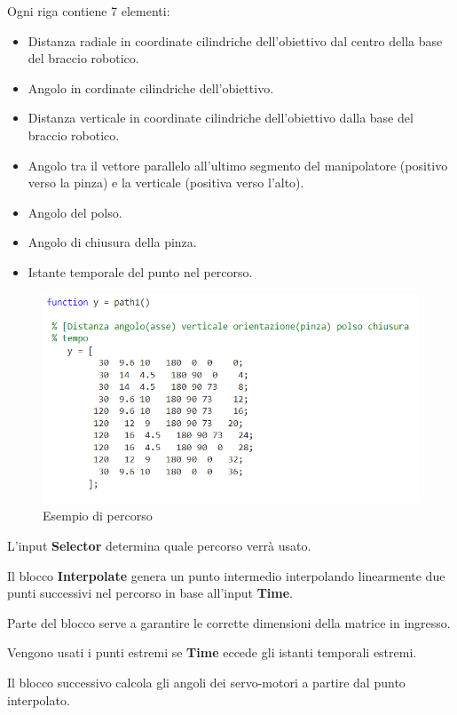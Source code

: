 \documentclass[12pt]{report}
\begin{document}
Ogni riga contiene 7 elementi:

\begin{itemize}
\item Distanza radiale in coordinate cilindriche dell'obiettivo dal centro della base del braccio robotico.
\item Angolo in cordinate cilindriche dell'obiettivo.
\item Distanza verticale in coordinate cilindriche dell'obiettivo dalla base del braccio robotico.
\item Angolo tra il vettore parallelo all'ultimo segmento del manipolatore (positivo verso la pinza) e la verticale (positiva verso l'alto).
\item Angolo del polso.
\item Angolo di chiusura della pinza.
\item Istante temporale del punto nel percorso.
\end{itemize}

\begin{figure}
\includegraphics[width=\textwidth]{Path_structure}
\caption{Esempio di percorso}
\end{figure}

L'input \textbf{Selector} determina quale percorso verrà usato.

Il blocco \textbf{Interpolate} genera un punto intermedio interpolando linearmente due punti successivi nel percorso in base all'input \textbf{Time}.

Parte del blocco serve a garantire le corrette dimensioni della matrice in ingresso.

Vengono usati i punti estremi se \textbf{Time} eccede gli istanti temporali estremi.

Il blocco successivo calcola gli angoli dei servo-motori a partire dal punto interpolato.
\end{document}
